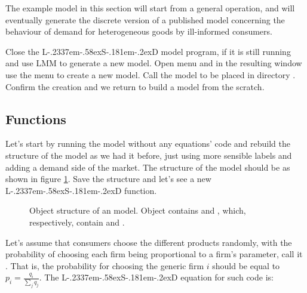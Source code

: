 \documentclass [11pt,a4paper] {book}
\def\LsD{{L\kern-.2337em\lower-.58ex\hbox{S}\kern-.181em\lower-.2ex\hbox{D}}\xspace}
\begin{document}
The example model in this section will start from a general operation, and will eventually generate the discrete version of a published model concerning the behaviour of demand for heterogeneous goods by ill-informed consumers.


Close the \LsD model program, if it is still running and use LMM to generate a new model. Open menu  and in the resulting window use the menu  to create a new model. Call the model  to be placed in directory . Confirm the creation and we return to build a model from the scratch.

\subsection{Functions}

Let's start by running the model without any equations' code and rebuild the structure of the model as we had it before, just using more sensible labels and adding a demand side of the market. The structure of the model should be as shown in figure \ref{fig:abm}. Save the structure and let's see a new \LsD function.

\begin{figure}[ht]
  \centering
  \caption{\small Object structure of an model. Object  contains  and , which, respectively, contain  and .}
   \label{fig:abm}
\end{figure}

Let's assume that consumers choose the different products randomly, with the probability of choosing each firm being proportional to a firm's parameter, call it . That is, the probability for choosing the generic firm $i$ should be equal to $p_i=\frac{q_i}{\sum_j q_j}$. The \LsD equation for such code is:
\end{document}
